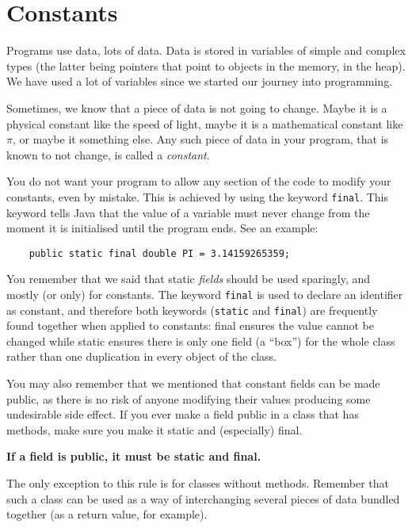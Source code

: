 
\section{Constants}
\label{sec:constants}

Programs use data, lots of data. Data is stored in variables of simple
and complex types (the latter being pointers that point to objects in
the memory, in the heap). We have used a lot of variables since we
started our journey into programming. 

Sometimes, we know that a piece of data is not going to change. 
Maybe it is a physical constant like the
speed of light, maybe it is a mathematical constant like $\pi$, or
maybe it something else. Any such piece of data in your program, that
is known to not change, is called a \emph{constant}. 

You do not want your program to allow any section
of the code to modify your constants, even by mistake. This is achieved by
using the keyword \verb+final+. This keyword tells Java that the value
of a variable must never change from the moment it is initialised
until the program ends. See an example: 

\begin{verbatim}
    public static final double PI = 3.14159265359; 
\end{verbatim}

You remember that we said that static \emph{fields} should be used
sparingly, and mostly (or only) for constants. The keyword
\verb+final+ is used to declare an identifier as constant, and
therefore both keywords (\verb+static+ and \verb+final+)
are frequently found together when applied to constants: final ensures
the value cannot be changed while static ensures there is only one
field (a ``box'') for the whole class rather than one duplication in
every object of the class.

You may also remember that we mentioned that constant fields can be
made public, as there is no risk of anyone modifying their values
producing some undesirable side effect. If you ever make a field public in a
class that has methods, make sure you make it static and (especially)
final.

\begin{center}
{\large \textbf{If a field is public, it must be static and final.}}  
\end{center}

The only exception to this rule is for classes without
methods. Remember that such a class can be used as a way of
interchanging several pieces of data bundled together (as a return
value, for example). 

